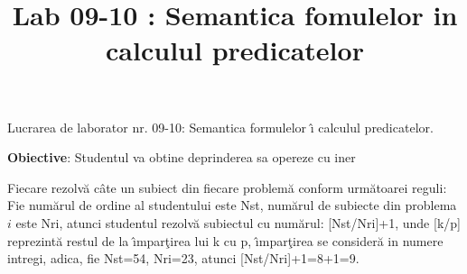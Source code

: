 \documentclass{article}
\title{Lab 09-10 : Semantica fomulelor in calculul predicatelor}
\begin{document}
\begin{center}
Lucrarea de laborator nr. 09-10: Semantica formulelor \^{\i} calculul predicatelor. 
\end{center}

{\bf Obiective}: Studentul va obtine deprinderea sa opereze cu iner

Fiecare rezolv\u{a} c\^{a}te un subiect din fiecare problem\u{a} conform urm\u{a}toarei reguli: Fie num\u{a}rul de ordine al studentului este Nst, num\u{a}rul de subiecte din problema $i$ este Nri, atunci studentul rezolv\u{a} subiectul cu num\u{a}rul: [Nst/Nri]+1, unde [k/p] reprezint\u{a} restul de la \^{\i}mpar\c{t}irea lui k cu p, \^{\i}mpar\c{t}irea se consider\u{a} in numere intregi, adica, fie Nst=54, Nri=23, atunci [Nst/Nri]+1=8+1=9.  

\bigskip
\end{document}
